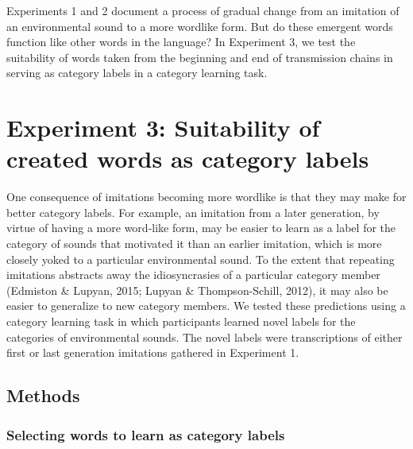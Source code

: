 \documentclass[english,floatsintext,man]{apa6}
\theoremstyle{definition}
\theoremstyle{definition}
\theoremstyle{definition}
\theoremstyle{remark}
\begin{document}
Experiments 1 and 2 document a process of gradual change from an
imitation of an environmental sound to a more wordlike form. But do
these emergent words function like other words in the language? In
Experiment 3, we test the suitability of words taken from the beginning
and end of transmission chains in serving as category labels in a
category learning task.

\hypertarget{experiment-3-suitability-of-created-words-as-category-labels}{%
\section{Experiment 3: Suitability of created words as category
labels}\label{experiment-3-suitability-of-created-words-as-category-labels}}

One consequence of imitations becoming more wordlike is that they may
make for better category labels. For example, an imitation from a later
generation, by virtue of having a more word-like form, may be easier to
learn as a label for the category of sounds that motivated it than an
earlier imitation, which is more closely yoked to a particular
environmental sound. To the extent that repeating imitations abstracts
away the idiosyncrasies of a particular category member (Edmiston \&
Lupyan, 2015; Lupyan \& Thompson-Schill, 2012), it may also be easier to
generalize to new category members. We tested these predictions using a
category learning task in which participants learned novel labels for
the categories of environmental sounds. The novel labels were
transcriptions of either first or last generation imitations gathered in
Experiment 1.

\hypertarget{methods-2}{%
\subsection{Methods}\label{methods-2}}

\hypertarget{selecting-words-to-learn-as-category-labels}{%
\subsubsection{Selecting words to learn as category
labels}\label{selecting-words-to-learn-as-category-labels}}
\end{document}
